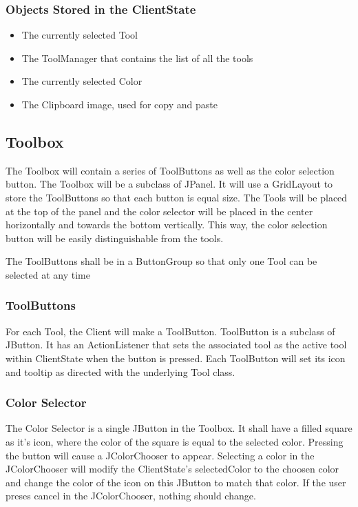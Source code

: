 \documentclass[11pt,oneside,a4paper]{article}
\begin{document}
  \subsubsection{Objects Stored in the ClientState}
  \begin{itemize}
  \item
  The currently selected Tool
  \item 
  The ToolManager that contains the list of all the tools
  \item 
  The currently selected Color
  \item
  The Clipboard image, used for copy and paste
  \end{itemize}

 \subsection{Toolbox}
  The Toolbox will contain a series of ToolButtons as well as the color
  selection button. The Toolbox will be a subclass of JPanel. It will use a
  GridLayout to store the ToolButtons so that each button is equal size. The
  Tools will be placed at the top of the panel and the color selector will be
  placed in the center horizontally and towards the bottom vertically. This
  way, the color selection button will be easily distinguishable from the
  tools. 
  
  The ToolButtons shall be in a ButtonGroup so that only one Tool can be
  selected at any time 

  \subsubsection{ToolButtons}
   For each Tool, the Client will make a ToolButton. ToolButton is a subclass
   of JButton.  It has an ActionListener that sets the associated tool as the
   active tool within ClientState when the button is pressed. Each ToolButton will
   set its icon and tooltip as directed with the underlying Tool class.

 \subsubsection{Color Selector}
 The Color Selector is a single JButton in the Toolbox. It shall have a filled
 square as it's icon, where the color of the square is equal to the selected
 color. Pressing the button will cause a JColorChooser to appear. Selecting a
 color in the JColorChooser will modify the ClientState's selectedColor to the
 choosen color and change the color of the icon on this JButton to match that
 color. If the user preses cancel in the JColorChooser, nothing should change.
\end{document}
